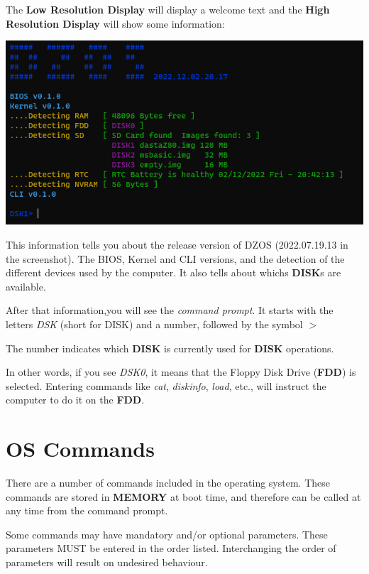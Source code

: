 \documentclass[a4paper,11pt]{article}
\begin{document}
    The \textbf{Low Resolution Display} will display a welcome text and the 
    \textbf{High Resolution Display} will show some information:

    \includegraphics[scale=0.6]{images/dzOS.png}

    This information tells you about the release version of DZOS (2022.07.19.13
    in the screenshot). The BIOS, Kernel and CLI versions, and the detection of
    the different devices used by the computer. It also tells about whichs 
    \textbf{DISK}s are available.

    After that information,you will see the \textit{command prompt}. It starts
    with the letters \textit{DSK} (short for DISK) and a number, followed by the
    symbol $>$

    The number indicates which \textbf{DISK} is currently used for \textbf{DISK}
    operations.

    In other words, if you see \textit{DSK0}, it means that the Floppy Disk Drive
    (\textbf{FDD}) is selected. Entering commands like \textit{cat},
    \textit{diskinfo}, \textit{load}, etc., will instruct the computer to do it
    on the \textbf{FDD}.

    \pagebreak
    \section{OS Commands}
    There are a number of commands included in the operating system. These
    commands are stored in \textbf{MEMORY} at boot time, and therefore can be
    called at any time from the command prompt.

    Some commands may have mandatory and/or optional parameters. These
    parameters MUST be entered in the order listed. Interchanging the order of
    parameters will result on undesired behaviour.
\end{document}
